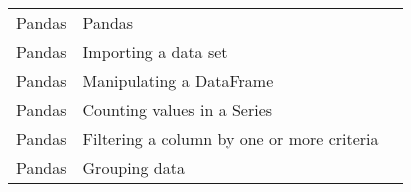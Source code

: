 \documentclass[10pt,a4paper]{article}
\begin{document}
\begin{landscape}
\begin{longtable}{|l|l|l|}
Pandas & Pandas & \cite{paskhaver2021pandas} \\
    Pandas & Importing a data set & \cite{paskhaver2021pandas} \\
    Pandas & Manipulating a DataFrame & \cite{paskhaver2021pandas} \\
    Pandas & Counting values in a Series & \cite{paskhaver2021pandas} \\
    Pandas & Filtering a column by one or more criteria & \cite{paskhaver2021pandas} \\
    Pandas & Grouping data & \cite{paskhaver2021pandas} \\
    

\end{longtable}
\end{landscape}

\restoregeometry


\end{document}

